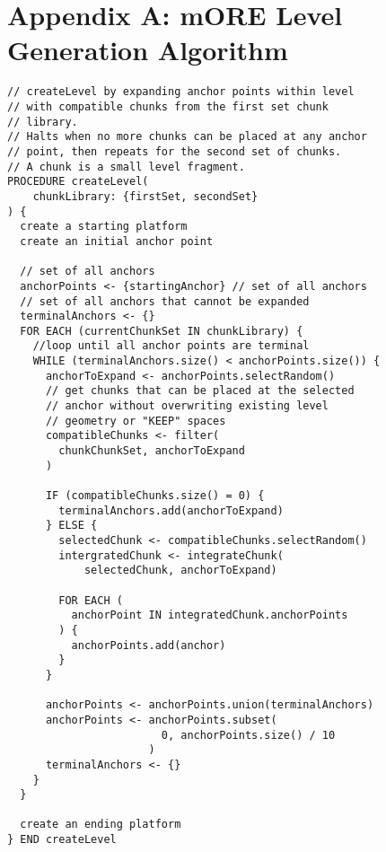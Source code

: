 \chapter*{Appendix A: mORE Level Generation Algorithm}

\begin{lstlisting}[basicstyle=\footnotesize]
// createLevel by expanding anchor points within level 
// with compatible chunks from the first set chunk 
// library.
// Halts when no more chunks can be placed at any anchor 
// point, then repeats for the second set of chunks. 
// A chunk is a small level fragment.
PROCEDURE createLevel(
    chunkLibrary: {firstSet, secondSet}
) {
  create a starting platform
  create an initial anchor point

  // set of all anchors
  anchorPoints <- {startingAnchor} // set of all anchors
  // set of all anchors that cannot be expanded
  terminalAnchors <- {} 
  FOR EACH (currentChunkSet IN chunkLibrary) {
    //loop until all anchor points are terminal
    WHILE (terminalAnchors.size() < anchorPoints.size()) {
      anchorToExpand <- anchorPoints.selectRandom()
      // get chunks that can be placed at the selected 
      // anchor without overwriting existing level 
      // geometry or "KEEP" spaces
      compatibleChunks <- filter(
        chunkChunkSet, anchorToExpand
      )

      IF (compatibleChunks.size() = 0) {
        terminalAnchors.add(anchorToExpand)
      } ELSE {
        selectedChunk <- compatibleChunks.selectRandom()
        intergratedChunk <- integrateChunk(
            selectedChunk, anchorToExpand)

        FOR EACH (
          anchorPoint IN integratedChunk.anchorPoints
        ) {
          anchorPoints.add(anchor)
        }    
      }

      anchorPoints <- anchorPoints.union(terminalAnchors)
      anchorPoints <- anchorPoints.subset(
                        0, anchorPoints.size() / 10
                      )
      terminalAnchors <- {}
    }
  }

  create an ending platform
} END createLevel
\end{lstlisting}

